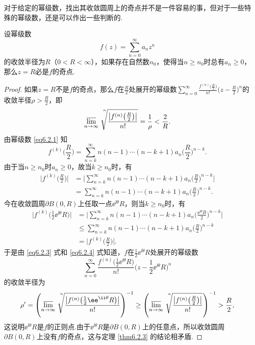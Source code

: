对于给定的幂级数，找出其收敛圆周上的奇点并不是一件容易的事，但对于一些特殊的幂级数，还是可以作出一些判断的.

\begin{prop}\label{prop6.2.4}
设幂级数
\[f(z)=\sum_{n=0}^\infty a_nz^n\]
的收敛半径为$R$（$0<R<\infty$），如果存在自然数$n_0$，使得当$n\ge n_0$时总有$a_n\ge0$，那么$z=R$必是$f$的奇点.
\end{prop}
\begin{proof}
如果$z=R$不是$f$的奇点，那么$f$在$\frac R2$处展开的幂级数$\sum_{n=0}^\infty
\frac{f^{(n)}\big(\frac R2\big)}{n!}\bigg(z-\frac R2\bigg)^n$的收敛半径$\rho>\frac R2$，即
\begin{equation}\label{eq6.2.3}
\varlimsup_{n\to\infty}\sqrt[\leftroot{-4}\uproot{20}n]{
\frac{\big|f^{(n)}\big(\frac R2\big)\big|}{n!}}=\frac1\rho<\frac2R.
\end{equation}
由幂级数 \eqref{eq6.2.1} 知
\[f^{(k)}\bigg(\frac R2\bigg)=\sum_{n=k}^\infty n(n-1)\cdots(n-k+1)a_n
\bigg(\frac R2\bigg)^{n-k}.\]
由于当$n\ge n_0$时$a_n\ge0$，故当$k\ge n_0$时，有
\begin{align*}
\bigg|f^{(k)}\bigg(\frac R2\bigg)\bigg|
&=\bigg|\sum_{n=k}^\infty n(n-1)\cdots(n-k+1)a_n\bigg(\frac R2\bigg)^{n-k}\bigg|\\
&=\sum_{n=k}^\infty n(n-1)\cdots(n-k+1)a_n\bigg(\frac R2\bigg)^{n-k}.
\end{align*}
今在收敛圆周$\partial B(0,R)$上任取一点$\ee^{\ii\theta}R$，则当$k\ge n_0$时，有
\begin{equation}\label{eq6.2.4}
\begin{aligned}
\bigg|f^{(k)}\bigg(\frac12\ee^{\ii\theta}R\bigg)\bigg|
&=\bigg|\sum_{n=k}^\infty n(n-1)\cdots(n-k+1)a_n\bigg(\frac {\ee^{\ii\theta}R}2\bigg)^{n-k}\bigg|\\
&\le \sum_{n=k}^\infty n(n-1)\cdots(n-k+1)a_n\bigg(\frac R2\bigg)^{n-k}\\
&=\bigg|f^{(k)}\bigg(\frac R2\bigg)\bigg|.
\end{aligned}
\end{equation}
于是由 \eqref{eq6.2.3} 式和 \eqref{eq6.2.4} 式知道，$f$在$\frac12\ee^{\ii\theta}R$处展开的幂级数
\[\sum_{n=0}^\infty\frac{f^{(n)}\big(\frac12\ee^{\ii\theta}R\big)}{n!}
\bigg(z-\frac12\ee^{\ii\theta}R\bigg)^n\]
的收敛半径为
\[\rho'=\left(\varlimsup_{n\to\infty}
\sqrt[\leftroot{-4}\uproot{20}n]{
\frac{\big|f^{(n)}\big(\frac 12\ee^{\ii\theta}R\big)\big|}{n!}}\right)^{-1}
\ge\left(\varlimsup_{n\to\infty}\sqrt[\leftroot{-4}\uproot{20}n]{
\frac{\big|f^{(n)}\big(\frac R2\big)\big|}{n!}}\right)^{-1}
>\frac R2,\]
这说明$\ee^{\ii\theta}R$是$f$的正则点.由于$\ee^{\ii\theta}R$是$\partial B(0,R)$上的任意点，所以收敛圆周$\partial B(0,R)$上没有$f$的奇点，这与定理 \ref{thm6.2.3} 的结论相矛盾.
\end{proof}

